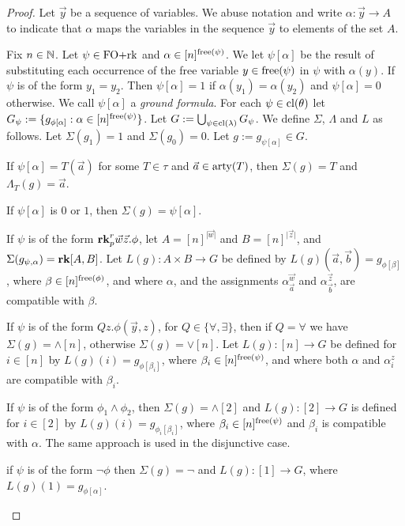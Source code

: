\documentclass[../paper.tex]{subfiles}
\begin{document}
\begin{proof}
  Let $\vec{y}$ be a sequence of variables. We abuse notation and write $\alpha
  :\vec{y} \rightarrow A$ to indicate that $\alpha$ maps the variables in the
  sequence $\vec{y}$ to elements of the set $A$.

  Fix $n \in \mathbb{N}$. Let $\psi \in \text{\upshape FO+rk}$ and $\alpha \in [n]^{\mathrm{free}(\psi)}$.
  We let $\psi[\alpha]$ be the result of substituting each occurrence of the
  free variable $y \in \mathrm{free}(\psi)$ in $\psi$ with $\alpha(y)$. If $\psi$ is of
  the form $y_1 = y_2$. Then $\psi [\alpha] = 1$ if $\alpha(y_1) = \alpha (y_2)$
  and $\psi[\alpha] = 0$ otherwise. We call $\psi[\alpha]$ a \emph{ground
    formula}. For each $\psi \in \mathrm{cl}(\theta)$ let $G_\psi := \{g_{\phi[\alpha]}
  : \alpha \in [n]^{\mathrm{free}(\psi)} \}$. Let $G := \bigcup_{\psi \in \mathrm{cl}(\lambda)}
  G_{\psi}$. We define $\Sigma$, $\Lambda$ and $L$ as follows. Let $\Sigma (g_1)
  = 1$ and $\Sigma (g_0) = 0$. Let $g := g_{\psi[\alpha]} \in G$.
  
  \begin{itemizens}
  \item If $\psi[\alpha] = T(\vec{a})$ for some $T \in \tau$ and $\vec{a} \in
    \mathrm{arty}(T)$, then $\Sigma (g) = T$ and $\Lambda_T (g) = \vec{a}$.
  \item If $\psi[\alpha]$ is $0$ or $1$, then $\Sigma (g) = \psi[\alpha]$.
  \item If $\psi$ is of the form $\text{\textbf{rk}}^r_p \vec{w} \vec{z}. \phi$, let $A =
    [n]^{\vert \vec{w}\vert}$ and $B = [n]^{\vert \vec{z}\vert}$, and $\Sigma
    (g_{\psi, \alpha}) = \text{\textbf{rk}}[A, B]$. Let $L(g) : A \times B \rightarrow G$ be
    defined by $L(g)(\vec{a},\vec{b}) = g_{\phi[\beta]}$, where $\beta \in
    [n]^{\mathrm{free}(\phi)}$, and where $\alpha$, and the assignments
    $\alpha^{\vec{w}}_{\vec{a}}$ and $\alpha^{\vec{z}}_{\vec{b}}$, are
    compatible with $\beta$.
  \item If $\psi$ is of the form $Q z . \phi(\vec{y}, z)$, for $Q \in \{\forall,
    \exists\}$, then if $Q = \forall$ we have $\Sigma (g) = \land [n]$,
    otherwise $\Sigma (g) = \lor [n]$. Let $L(g) : [n] \rightarrow G$ be defined
    for $i \in [n]$ by $L(g)(i) = g_{\phi[\beta_i]}$, where $\beta_i \in
    [n]^{\mathrm{free}(\psi)}$, and where both $\alpha$ and $\alpha^{z}_{i}$ are
    compatible with $\beta_i$.
  \item If $\psi$ is of the form $\phi_1 \land \phi_2$, then $\Sigma(g) =
    \land[2]$ and $L(g) : [2] \rightarrow G$ is defined for $i \in [2]$ by
    $L(g)(i) = g_{\phi_i[\beta_i]}$, where $\beta_i \in [n]^{\mathrm{free}(\psi)}$ and
    $\beta_i$ is compatible with $\alpha$. The same approach is used in the
    disjunctive case.
  \item if $\psi$ is of the form $\neg \phi$ then $\Sigma (g) = \neg$ and $L(g):
    [1] \rightarrow G$, where $L(g)(1) = g_{\phi[\alpha]}$.
  \end{itemizens}


\end{proof}
\end{document}
